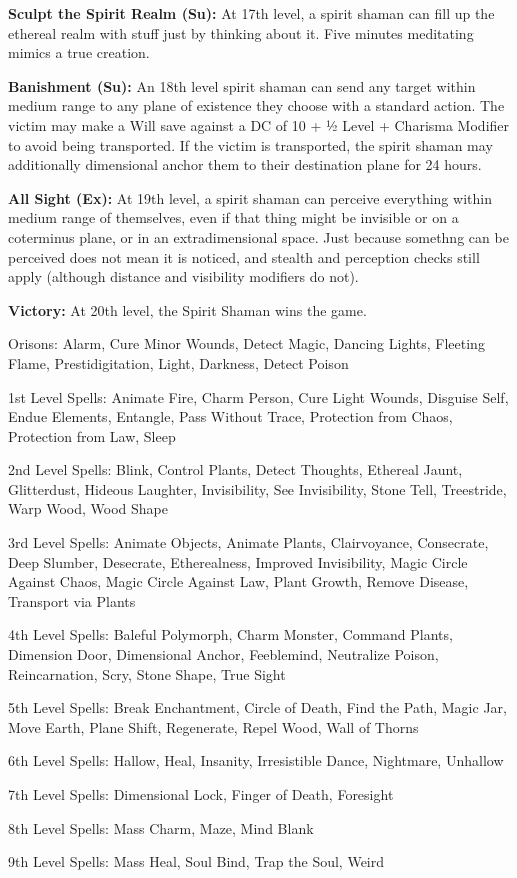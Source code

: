 \textbf{Sculpt the Spirit Realm (Su):} At 17th level, a spirit shaman can fill up the ethereal realm with stuff just by thinking about it. Five minutes meditating mimics a true creation.

\textbf{Banishment (Su):} An 18th level spirit shaman can send any target within medium range to any plane of existence they choose with a standard action. The victim may make a Will save against a DC of 10 + ½ Level + Charisma Modifier to avoid being transported. If the victim is transported, the spirit shaman may additionally dimensional anchor them to their destination plane for 24 hours.

\textbf{All Sight (Ex):} At 19th level, a spirit shaman can perceive everything within medium range of themselves, even if that thing might be invisible or on a coterminus plane, or in an extradimensional space. Just because somethng can be perceived does not mean it is noticed, and stealth and perception checks still apply (although distance and visibility modifiers do not).

\textbf{Victory:} At 20th level, the Spirit Shaman wins the game.

\begin{description*}
\item[Orisons:] Alarm, Cure Minor Wounds, Detect Magic, Dancing Lights, Fleeting Flame, Prestidigitation, Light, Darkness, Detect Poison
\item[1st Level Spells:] Animate Fire, Charm Person, Cure Light Wounds, Disguise Self, Endue Elements, Entangle, Pass Without Trace, Protection from Chaos, Protection from Law, Sleep
\item[2nd Level Spells:] Blink, Control Plants, Detect Thoughts, Ethereal Jaunt, Glitterdust, Hideous Laughter, Invisibility, See Invisibility, Stone Tell, Treestride, Warp Wood, Wood Shape
\item[3rd Level Spells:] Animate Objects, Animate Plants, Clairvoyance, Consecrate, Deep Slumber, Desecrate, Etherealness, Improved Invisibility, Magic Circle Against Chaos, Magic Circle Against Law, Plant Growth, Remove Disease, Transport via Plants
\item[4th Level Spells:] Baleful Polymorph, Charm Monster, Command Plants, Dimension Door, Dimensional Anchor, Feeblemind, Neutralize Poison, Reincarnation, Scry, Stone Shape, True Sight
\item[5th Level Spells:] Break Enchantment, Circle of Death, Find the Path, Magic Jar, Move Earth, Plane Shift, Regenerate, Repel Wood, Wall of Thorns
\item[6th Level Spells:] Hallow, Heal, Insanity, Irresistible Dance, Nightmare, Unhallow
\item[7th Level Spells:] Dimensional Lock, Finger of Death, Foresight
\item[8th Level Spells:] Mass Charm, Maze, Mind Blank
\item[9th Level Spells:] Mass Heal, Soul Bind, Trap the Soul, Weird
\end{description*}
